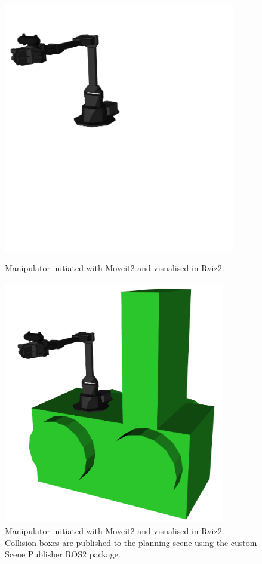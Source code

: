 \begin{figure}[H]
  \centering
  \begin{minipage}[b]{0.49\textwidth}
        \centering
        \includegraphics[width = 0.9\textwidth]{Figures/figScenePublisher1.png}
        \caption{Manipulator initiated with Moveit2 and visualised in Rviz2.}
        \label{fig:R:P&P:CSP:scenePublisher1}
  \end{minipage}
  \hfill
  \begin{minipage}[b]{0.49\textwidth}
    \centering
    \includegraphics[width = 0.86\textwidth]{Figures/figScenePublisher2.png}
    \caption{Manipulator initiated with Moveit2 and visualised in Rviz2. Collision boxes are published to the planning scene using the custom Scene Publisher ROS2 package.}
    \label{fig:R:P&P:CSP:scenePublisher2}
  \end{minipage}
\end{figure}



